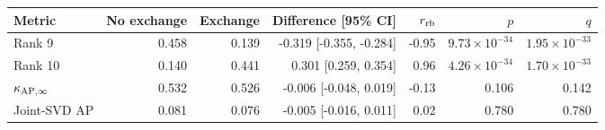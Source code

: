 \begin{tabular}{lrrrrrr}
\toprule
Metric & No exchange & Exchange & Difference [95\% CI] & $r_{\rm rb}$ & $p$ & $q$ \\
\midrule
Rank 9 & 0.458 & 0.139 & -0.319 [-0.355, -0.284] & -0.95 & $9.73\times10^{-34}$ & $1.95\times10^{-33}$ \\
Rank 10 & 0.140 & 0.441 & 0.301 [0.259, 0.354] & 0.96 & $4.26\times10^{-34}$ & $1.70\times10^{-33}$ \\
$\kappa_{{\rm AP},\infty}$ & 0.532 & 0.526 & -0.006 [-0.048, 0.019] & -0.13 & 0.106 & 0.142 \\
Joint-SVD AP & 0.081 & 0.076 & -0.005 [-0.016, 0.011] & 0.02 & 0.780 & 0.780 \\
\bottomrule
\end{tabular}
